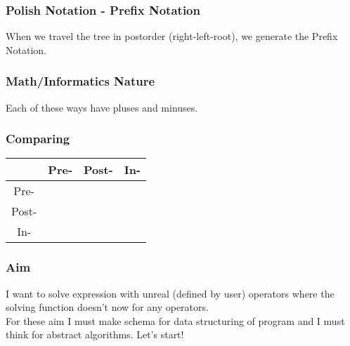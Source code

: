\documentclass[12pt]{beamer}
\begin{document}
   	\begin{frame}
   		\frametitle{Polish Notation - Prefix Notation}
   		\begin{center}
   			{\large
   				When we travel the tree in postorder (right-left-root), we generate the Prefix Notation.}\\\vspace{0.5cm}{\Large
   				In this case Prefix Notation is $d e * c + a b * -$
   			}
   		{\small
   		}
   	\end{center}
   	\end{frame}

	\begin{frame}
	\frametitle{Math/Informatics Nature}
		Each of these ways have pluses and minuses. 
	\end{frame}

	\begin{frame}
	\frametitle{Comparing}
       {\footnotesize   
       \begin{tabularx}{\textwidth}{c|c|c|c}
                         & Pre- & Post- & In-\\
          \hline
          Pre- &  & & \\
          Post- &  & & \\
          In- &  & & \\
          \hline
       \end{tabularx}
       }
	\end{frame}

	\begin{frame}
	\frametitle{Aim}
	I want to solve expression with unreal (defined by user) operators where the solving function doesn't now for any operators.\\
	For these aim I must make schema for data structuring of program and I must think for abstract algorithms.
	Let's start!
	\end{frame}
	
\end{document}
